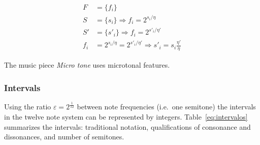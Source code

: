 \begin{equation}\label{eq:micro}
\begin{split}
    F   & = \{f_i\}\\
    S   & = \{s_i\} \Rightarrow f_i = 2^{s_i/\eta}\\
    S'  & = \{s'_i\} \Rightarrow f_i = 2^{s'_i/\eta'}\\
    f_i & =  2^{s_i/\eta} = 2^{s'_i/\eta'} \Rightarrow s'_i = s_i\frac{\eta'}{\eta} 
\end{split}
\end{equation}

The music piece \emph{Micro
tone} uses microtonal features.

\subsubsection{Intervals}\label{subsec:intervalos}
Using the ratio $\varepsilon=2^{\frac{1}{12}}$ between note frequencies (i.e.\ one semitone) the intervals in the twelve note system can be represented by integers. Table~\ref{eq:intervalos} summarizes the intervals: traditional notation, qualifications of consonance and
dissonances, and number of semitones.

